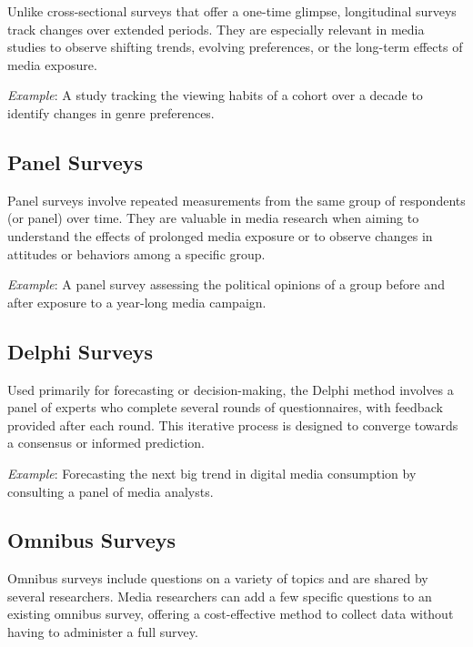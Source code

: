 \documentclass[
  b5paper]{book}
\begin{document}
Unlike cross-sectional surveys that offer a one-time glimpse, longitudinal surveys track changes over extended periods.
They are especially relevant in media studies to observe shifting trends, evolving preferences, or the long-term effects of media exposure.

\emph{Example}: A study tracking the viewing habits of a cohort over a decade to identify changes in genre preferences.

\hypertarget{panel-surveys}{%
\subsection*{Panel Surveys}\label{panel-surveys}}

Panel surveys involve repeated measurements from the same group of respondents (or panel) over time.
They are valuable in media research when aiming to understand the effects of prolonged media exposure or to observe changes in attitudes or behaviors among a specific group.

\emph{Example}: A panel survey assessing the political opinions of a group before and after exposure to a year-long media campaign.

\hypertarget{delphi-surveys}{%
\subsection*{Delphi Surveys}\label{delphi-surveys}}

Used primarily for forecasting or decision-making, the Delphi method involves a panel of experts who complete several rounds of questionnaires, with feedback provided after each round.
This iterative process is designed to converge towards a consensus or informed prediction.

\emph{Example}: Forecasting the next big trend in digital media consumption by consulting a panel of media analysts.

\hypertarget{omnibus-surveys}{%
\subsection*{Omnibus Surveys}\label{omnibus-surveys}}

Omnibus surveys include questions on a variety of topics and are shared by several researchers.
Media researchers can add a few specific questions to an existing omnibus survey, offering a cost-effective method to collect data without having to administer a full survey.
\end{document}
